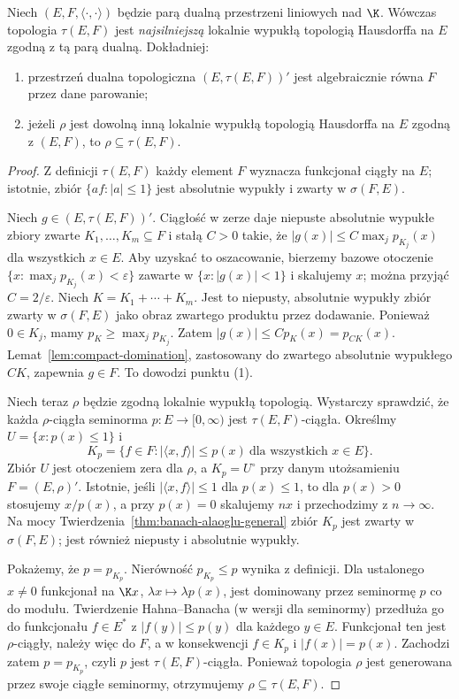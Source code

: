 \begin{twierdzenie}\label{thm:mackey-arens}
Niech $(E,F,\langle\cdot,\cdot\rangle)$ będzie parą dualną
przestrzeni liniowych nad $\K$. Wówczas topologia
$\tau(E,F)$ jest \emph{najsilniejszą} lokalnie wypukłą
topologią Hausdorffa na $E$ zgodną z tą parą dualną.
Dokładniej:
\begin{enumerate}
\item przestrzeń dualna topologiczna $(E,\tau(E,F))'$ jest
      algebraicznie równa $F$ przez dane parowanie;
\item jeżeli $\rho$ jest dowolną inną lokalnie wypukłą topologią
      Hausdorffa na $E$ zgodną z $(E,F)$, to $\rho\subseteq\tau(E,F)$.
\end{enumerate}
\end{twierdzenie}
\begin{proof}
Z definicji $\tau(E,F)$ każdy element $F$ wyznacza
funkcjonał ciągły na $E$; istotnie, zbiór
$\{af:|a|\le1\}$ jest absolutnie wypukły i zwarty
w $\sigma(F,E)$.

Niech $g\in(E,\tau(E,F))'$. Ciągłość w zerze daje
niepuste absolutnie wypukłe zbiory zwarte
$K_1,\ldots,K_m\subseteq F$ i stałą $C>0$ takie, że
$|g(x)|\le C\max_j p_{K_j}(x)$ dla wszystkich $x\in E$.
Aby uzyskać to oszacowanie, bierzemy bazowe otoczenie
$\{x:\max_j p_{K_j}(x)<\varepsilon\}$ zawarte w
$\{x:|g(x)|<1\}$ i skalujemy $x$; można przyjąć
$C=2/\varepsilon$. Niech $K=K_1+\cdots+K_m$.
Jest to niepusty, absolutnie wypukły zbiór zwarty
w $\sigma(F,E)$ jako obraz zwartego produktu przez dodawanie.
Ponieważ $0\in K_j$, mamy $p_K\ge\max_j p_{K_j}$.
Zatem $|g(x)|\le C p_K(x)=p_{CK}(x)$.
Lemat~\ref{lem:compact-domination}, zastosowany do zwartego
absolutnie wypukłego $CK$, zapewnia $g\in F$.
To dowodzi punktu (1).

Niech teraz $\rho$ będzie zgodną lokalnie wypukłą topologią.
Wystarczy sprawdzić, że każda $\rho$-ciągła seminorma
$p:E\to[0,\infty)$ jest $\tau(E,F)$-ciągła.
Określmy $U=\{x:p(x)\le1\}$ i
\[
 K_p=\{f\in F:|\langle x,f\rangle|\le p(x)
                 \ \text{dla wszystkich }x\in E\}.
\]
Zbiór $U$ jest otoczeniem zera dla $\rho$, a
$K_p=U^\circ$ przy danym utożsamieniu $F=(E,\rho)'$.
Istotnie, jeśli $|\langle x,f\rangle|\le1$ dla $p(x)\le1$,
to dla $p(x)>0$ stosujemy $x/p(x)$, a przy $p(x)=0$
skalujemy $nx$ i przechodzimy z $n\to\infty$.
Na mocy Twierdzenia~\ref{thm:banach-alaoglu-general}
zbiór $K_p$ jest zwarty w $\sigma(F,E)$;
jest również niepusty i absolutnie wypukły.

Pokażemy, że $p=p_{K_p}$. Nierówność $p_{K_p}\le p$
wynika z definicji. Dla ustalonego $x\ne0$ funkcjonał
na $\K x$, $\lambda x\mapsto\lambda p(x)$,
jest dominowany przez seminormę $p$ co do modułu.
Twierdzenie Hahna--Banacha (w wersji dla seminormy)
przedłuża go do funkcjonału $f\in E^*$ z
$|f(y)|\le p(y)$ dla każdego $y\in E$.
Funkcjonał ten jest $\rho$-ciągły, należy więc do $F$,
a w konsekwencji $f\in K_p$ i $|f(x)|=p(x)$.
Zachodzi zatem $p=p_{K_p}$, czyli $p$ jest
$\tau(E,F)$-ciągła. Ponieważ topologia $\rho$ jest
generowana przez swoje ciągłe seminormy, otrzymujemy
$\rho\subseteq\tau(E,F)$.
\end{proof}

